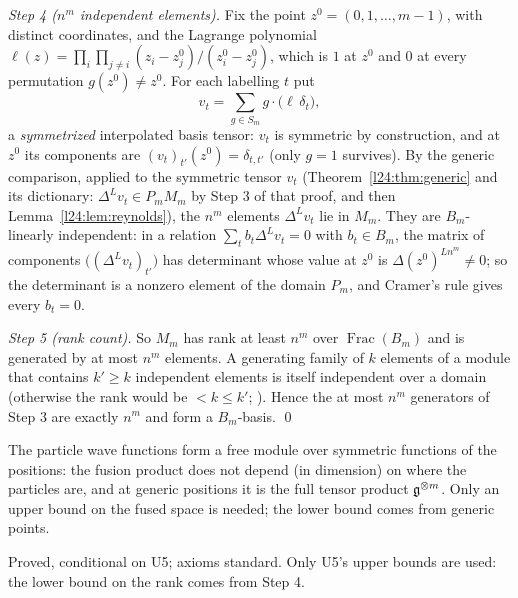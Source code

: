 \emph{Step 4 ($n^m$ independent elements).} Fix the point $z^0=(0,1,\dots,m-1)$, with distinct coordinates, and the Lagrange
polynomial $\ell(z)=\prod_i\prod_{j\neq i}(z_i-z^0_j)/(z^0_i-z^0_j)$, which is $1$ at $z^0$ and $0$ at every permutation
$g(z^0)\neq z^0$. For each labelling $t$ put
\begin{equation*}
v_t=\sum_{g\in S_m}g\cdot\bigl(\ell\,\delta_t\bigr),
\end{equation*}
a \emph{symmetrized} interpolated basis tensor: $v_t$ is symmetric by construction, and at $z^0$ its components are
$(v_t)_{t'}(z^0)=\delta_{t,t'}$ (only $g=1$ survives). By the generic comparison, applied to the symmetric tensor $v_t$
(Theorem~\ref{l24:thm:generic} and its dictionary: $\Delta^Lv_t\in P_mM_m$ by Step 3 of that proof, and then
Lemma~\ref{l24:lem:reynolds}), the $n^m$ elements $\Delta^Lv_t$ lie in $M_m$. They are $B_m$-linearly independent: in a relation
$\sum_tb_t\Delta^Lv_t=0$ with $b_t\in B_m$, the matrix of components $\bigl((\Delta^Lv_t)_{t'}\bigr)$ has determinant whose
value at $z^0$ is $\Delta(z^0)^{Ln^m}\neq0$; so the determinant is a nonzero element of the domain $P_m$, and Cramer's rule gives
every $b_t=0$.

\emph{Step 5 (rank count).} So $M_m$ has rank at least $n^m$ over $\operatorname{Frac}(B_m)$ and is generated by at most $n^m$
elements. A generating family of $k$ elements of a module that contains $k'\ge k$ independent elements is itself independent
over a domain (otherwise the rank would be $<k\le k'$; ). Hence the at most $n^m$
generators of Step 3 are exactly $n^m$ and form a $B_m$-basis. \qed

\begin{physics}
The particle wave functions form a free module over symmetric functions of the positions: the fusion product does
not depend (in dimension) on where the particles are, and at generic positions it is the full tensor product
$\mathfrak g^{\otimes m}$. Only an upper bound on the fused space is needed; the lower bound comes from generic points.
\end{physics}

\begin{status}
Proved, conditional on U5; axioms standard. Only U5's upper bounds are used: the lower bound on the rank comes from Step 4.
\end{status}

